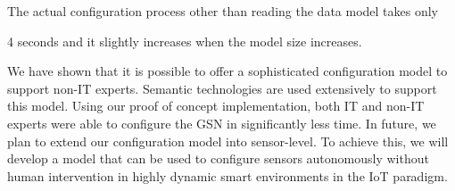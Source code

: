 The actual configuration process other than reading the data model takes only

4 seconds and it slightly increases when the model size increases. 


We have shown that it is possible to offer a sophisticated configuration model to support non-IT experts. Semantic technologies are used extensively to support this model. Using our proof of concept implementation, both IT and non-IT experts were able to configure the GSN in significantly less time. In future, we plan to extend our configuration model into sensor-level. To achieve this, we will develop a model that can be used to configure sensors autonomously without human intervention in highly dynamic smart environments in the IoT paradigm. 
